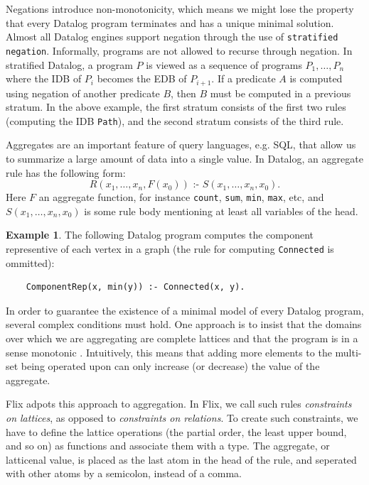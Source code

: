 \documentclass[11pt]{report}
\theoremstyle{definition}
\newtheorem{exmp}{Example}[chapter]
\begin{document}
Negations introduce non-monotonicity, which means we might lose the property that every Datalog program terminates and has a unique minimal solution. Almost all Datalog engines support negation through the use of \texttt{stratified negation}. Informally, programs are not allowed to recurse through negation. In stratified Datalog, a program $P$ is viewed as a sequence of programs $P_1, \ldots, P_n$ where the IDB of $P_i$ becomes the EDB of $P_{i+1}$. If a predicate $A$ is computed using negation of another predicate $B$, then $B$ must be computed in a previous stratum. In the above example, the first stratum consists of the first two rules (computing the IDB \texttt{Path}), and the second stratum consists of the third rule.

Aggregates are an important feature of query languages, e.g. SQL, that allow us to summarize a large amount of data into a single value. In Datalog, an aggregate rule has the following form:
$$R(x_1, \ldots, x_n, F(x_0)) \text{ :- } S(x_1, \ldots, x_n, x_0).$$
Here $F$ an aggregate function, for instance \texttt{count}, \texttt{sum}, \texttt{min}, \texttt{max}, etc, and $S(x_1, \ldots, x_n, x_0)$ is some rule body mentioning at least all variables of the head.

\begin{exmp}
  The following Datalog program computes the component representive of each vertex in a graph (the rule for computing \texttt{Connected} is ommitted):

  \begin{verbatim}
    ComponentRep(x, min(y)) :- Connected(x, y).
  \end{verbatim}
\end{exmp}

In order to guarantee the existence of a minimal model of every Datalog program, several complex conditions must hold. One approach is to insist that the domains over which we are aggregating are complete lattices and that the program is in a sense monotonic \cite{ROSS199779}. Intuitively, this means that adding more elements to the multi-set being operated upon can only increase (or decrease) the value of the aggregate.

Flix adpots this approach to aggregation. In Flix, we call such rules \textit{constraints on lattices}, as opposed to \textit{constraints on relations}. To create such constraints, we have to define the lattice operations (the partial order, the least upper bound, and so on) as functions and associate them with a type. The aggregate, or latticenal value, is placed as the last atom in the head of the rule, and seperated with other atoms by a semicolon, instead of a comma.
\end{document}
